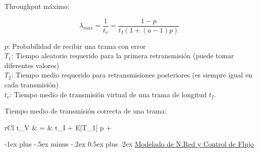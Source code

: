 \documentclass[9pt,landscape]{extarticle}
\makeatletter
\renewcommand{\section}{\@startsection{section}{1}{0mm}%
                                {-1ex plus -.5ex minus -.2ex}%
                                {0.5ex plus .2ex}%
                                {\normalfont\large\bfseries}}
\makeatother
\begin{document}
\begin{multicols}{3}
Throughput máximo:

	\begin{equation*}
	\lambda_{max} = \frac{1}{t_{v}} = \frac{1 - p}{t_{I} (1 + (a - 1)p)}
	\end{equation*}

	\quad $p$: Probabilidad de recibir una trama con error\\
	\quad $T_{1}$: Tiempo aleatorio requerido para la primera retransmisión (puede tomar diferentes valores)\\
	\quad $T_{2}$: Tiempo medio requerido para retransmisiones posteriores (es siempre igual en cada transmisión)\\
	\quad $t_{v}$: Tiempo medio de transmisión virtual de una trama de longitud $t_{I}$.


Tiempo medio de transmisión correcta de una trama:

	\begin{IEEEeqnarray*}{rCl}
		t_{V} & = & t_{I} + E[T_{1}] p + 
	\end{IEEEeqnarray*}	



\section{\underline{Modelado de N.Red y Control de Flujo}}

%
%
%
%
%
%
%


\end{multicols}
\end{document}
